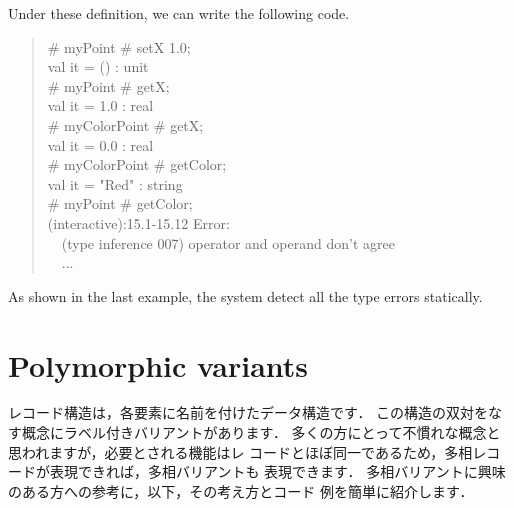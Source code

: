 \documentclass{jbook}
\newif\ifjp
\newcommand{\txt}[2]{#2}
\newcommand{\myem}{\mbox{\ \ }}
\begin{document}
	Under these definition, we can write the following code.
\begin{tt}\begin{quote}
\# myPoint \# setX 1.0;\\
val it = () : unit\\
\# myPoint \# getX;\\
val it = 1.0 : real\\
\# myColorPoint \# getX;\\
val it = 0.0 : real\\
\# myColorPoint \# getColor;\\
val it = "Red" : string\\
\# myPoint \# getColor;\\
(interactive):15.1-15.12 Error:\\
\myem  (type inference 007) operator and operand don't agree\\
\myem ...
\end{quote}\end{tt}
	As shown in the last example, the system detect all the type
errors statically.
\fi%

\section{\txt{多相バリアントの表現}{Polymorphic variants}}
\label{sec:extensionVariant}

\ifjp%
	レコード構造は，各要素に名前を付けたデータ構造です．
	この構造の双対をなす概念にラベル付きバリアントがあります．
	多くの方にとって不慣れな概念と思われますが，必要とされる機能はレ
コードとほぼ同一であるため，多相レコードが表現できれば，多相バリアントも
表現できます．
	多相バリアントに興味のある方への参考に，以下，その考え方とコード
例を簡単に紹介します．
\end{document}

